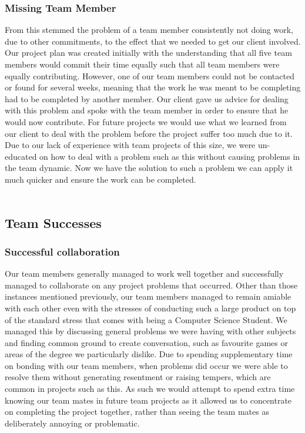 \documentclass{l3proj}
\begin{document}
\subsubsection{Missing Team Member}
From this stemmed the problem of a team member consistently not doing work, due to other commitments, to the effect that we needed to get our client involved. Our project plan was created initially with the understanding that all five team members would commit their time equally such that all team members were equally contributing. However, one of our team members could not be contacted or found for several weeks, meaning that the work he was meant to be completing had to be completed by another member. Our client gave us advice for dealing with this problem and spoke with the team member in order to ensure that he would now contribute. For future projects we would use what we learned from our client to deal with the problem before the project suffer too much due to it. Due to our lack of experience with team projects of this size, we were un-educated on how to deal with a problem such as this without causing problems in the team dynamic. Now we have the solution to such a problem we can apply it much quicker and ensure the work can be completed. \\
\\

\subsection{Team Successes}

\subsubsection{Successful collaboration}
Our team members generally managed to work well together and successfully managed to collaborate on any project problems that occurred. Other than those instances mentioned previously, our team members managed to remain amiable with each other even with the stresses of conducting such a large product on top of the standard stress that comes with being a Computer Science Student. We managed this by discussing general problems we were having with other subjects and finding common ground to create conversation, such as favourite games or areas of the degree we particularly dislike. Due to spending supplementary time on bonding with our team members, when problems did occur we were able to resolve them without generating resentment or raising tempers, which are common in projects such as this. As such we would attempt to spend extra time knowing our team mates in future team projects as it allowed us to concentrate on completing the project together, rather than seeing the team mates as deliberately annoying or problematic.\\
\\
\end{document}
